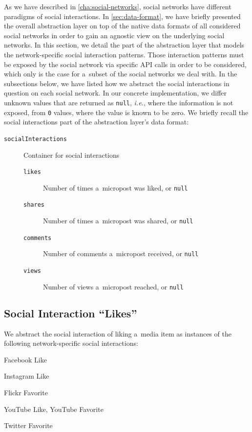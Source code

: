 As we have described in \autoref{cha:social-networks},
social networks have different paradigms of social interactions.
In \autoref{sec:data-format}, we have briefly presented the overall
abstraction layer on top of the native data formats
of all considered social networks in order to gain
an agnostic view on the underlying social networks.
In this section, we detail the part of the abstraction layer
that models the network-specific social interaction patterns.
Those interaction patterns must be exposed by the social network 
via specific API calls in order to be considered,
which only is the case for a~subset of the social networks we deal with.
In the subsections below, we have listed
how we abstract the social interactions in question on each social network.
In our concrete implementation, we differ unknown values
that are returned as \texttt{null}, \emph{i.e.},
where the information is not exposed,
from \texttt{0} values, where the value is known to be zero.
We briefly recall the social interactions part
of the abstraction layer's data format:

\begin{description}
  \item[\texttt{socialInteractions}] Container for social
    interactions
  \begin{description}  
  \item[\texttt{likes}] Number of times a~micropost was liked, or
    \texttt{null}
  \item[\texttt{shares}] Number of times a~micropost was shared, or
    \texttt{null}
  \item[\texttt{comments}] Number of comments a~micropost
    received, or \texttt{null}
  \item[\texttt{views}] Number of views a~micropost reached, or
    \texttt{null}
  \end{description}    
\end{description}

\subsection{Social Interaction ``Likes''}

We abstract the social interaction of liking a~media item
as instances of the following network-specific social interactions:

\begin{small_itemize}
  \item[] Facebook Like
  \item[] \googleplus \plusone
  \item[] Instagram Like
  \item[] Flickr Favorite
  \item[] YouTube Like, YouTube Favorite
  \item[] Twitter Favorite
\end{small_itemize}  

